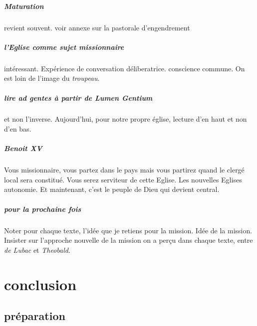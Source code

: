 \paragraph{Maturation} revient souvent.
voir annexe sur la pastorale d'engendrement

\paragraph{l'Eglise comme sujet missionnaire} intéressant. Expérience de conversation déliberatrice. conscience commune. On est loin de l'image du \textit{troupeau}. 

\paragraph{lire \textit{ad gentes} à partir de \textit{Lumen Gentium}} et non l'inverse. Aujourd'hui, pour notre propre église, lecture d'en haut et non d'en bas. 

\paragraph{Benoit XV} Vous missionnaire, vous partez dans le pays mais vous partirez quand le clergé local sera constitué. Vous serez serviteur de cette Eglise. Les nouvelles Eglises  autonomie. Et maintenant, c'est le peuple de Dieu qui devient central. 

\paragraph{pour la prochaine fois}
Noter pour chaque texte, l'idée que je retiens pour la mission. Idée de la mission. Insister sur l'approche nouvelle de la mission on a perçu dans chaque texte, entre \textit{de Lubac} et \textit{Theobald}.

\chapter{conclusion}

\section{préparation}

